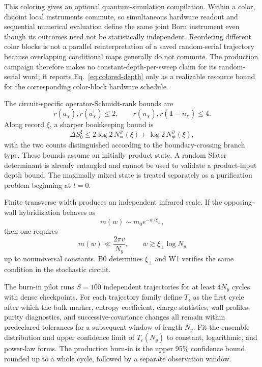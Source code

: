 \documentclass[aps,prx,onecolumn,nofootinbib,superscriptaddress,longbibliography]{revtex4-2}
\newcommand{\Id}{\mathbf{1}}
\begin{document}
This coloring gives an optional quantum-simulation compilation.  Within a color, disjoint
local instruments commute, so simultaneous hardware readout and sequential numerical
evaluation define the same joint Born instrument even though its outcomes need not be
statistically independent.  Reordering different color blocks is not a parallel
reinterpretation of a saved random-serial trajectory because overlapping conditional maps
generally do not commute.  The production campaign therefore makes no
constant-depth-per-sweep claim for its random-serial word; it reports
Eq.~\eqref{eq:colored-depth} only as a realizable resource bound for the corresponding
color-block hardware schedule.

The circuit-specific operator-Schmidt-rank bounds are
\begin{equation}
 r(a_\chi),r(a_\chi^\dagger)\le2,
 \qquad r(n_\chi),r(\Id-n_\chi)\le4.
\end{equation}
Along record $\xi$, a sharper bookkeeping bound is
\begin{equation}
 \Delta S_0^\xi
 \le 2\log2\,N_{=}^{\partial}(\xi)
 +\log2\,N_{\ne}^{\partial}(\xi),
\end{equation}
with the two counts distinguished according to the boundary-crossing branch type.  These
bounds assume an initially product state.  A random Slater determinant is already
entangled and cannot be used to validate a product-input depth bound.  The maximally mixed
state is treated separately as a purification problem beginning at $t=0$.

Finite transverse width produces an independent infrared scale.  If the opposing-wall
hybridization behaves as
\begin{equation}
 m(w)\sim m_0e^{-w/\xi_\perp},
\end{equation}
then one requires
\begin{equation}
 m(w)\ll\frac{2\pi v}{N_y},
 \qquad
 w\gtrsim\xi_\perp\log N_y
\end{equation}
up to nonuniversal constants.  B0 determines $\xi_\perp$ and W1 verifies the same condition
in the stochastic circuit.

The burn-in pilot runs $S=100$ independent trajectories for at least $4N_y$ cycles with
dense checkpoints.  For each trajectory family define $T_\epsilon$ as the first cycle after
which the bulk marker, entropy coefficient, charge statistics, wall profiles, purity
diagnostics, and successive-covariance changes all remain within predeclared tolerances for
a subsequent window of length $N_y$.  Fit the ensemble distribution and upper confidence
limit of $T_\epsilon(N_y)$ to constant, logarithmic, and power-law forms.  The production
burn-in is the upper 95\% confidence bound, rounded up to a whole cycle, followed by a
separate observation window.
\end{document}

